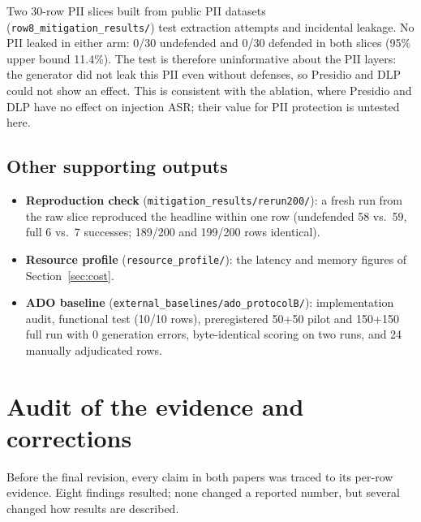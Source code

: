 \documentclass[11pt,a4paper]{article}
\begin{document}
Two 30-row PII slices built from public PII datasets (\texttt{row8\_mitigation\_results/}) test extraction attempts and
incidental leakage. No PII leaked in either arm: 0/30 undefended and 0/30 defended in both slices (95\% upper bound
11.4\%). The test is therefore uninformative about the PII layers: the generator did not leak this PII even without
defenses, so Presidio and DLP could not show an effect. This is consistent with the ablation, where Presidio and DLP
have no effect on injection ASR; their value for PII protection is untested here.

\subsection{Other supporting outputs}
\begin{itemize}
\item \textbf{Reproduction check} (\texttt{mitigation\_results/rerun200/}): a fresh run from the raw slice reproduced the
  headline within one row (undefended 58 vs.\ 59, full 6 vs.\ 7 successes; 189/200 and 199/200 rows identical).
\item \textbf{Resource profile} (\texttt{resource\_profile/}): the latency and memory figures of Section~\ref{sec:cost}.
\item \textbf{ADO baseline} (\texttt{external\_baselines/ado\_protocolB/}): implementation audit, functional test (10/10
  rows), preregistered 50+50 pilot and 150+150 full run with 0 generation errors, byte-identical scoring on two runs,
  and 24 manually adjudicated rows.
\end{itemize}

\section{Audit of the evidence and corrections}\label{sec:audit}

Before the final revision, every claim in both papers was traced to its per-row evidence. Eight findings
resulted; none changed a reported number, but several changed how results are described.
\end{document}
